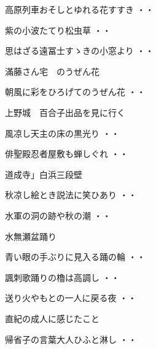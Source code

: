 \begin{shiika}高原列車おそしとゆれる花すすき
\hfill{・・}\end{shiika}
\begin{shiika}紫の小波たてり松虫草
\hfill{・・}\end{shiika}
\begin{shiika}思はざる遠冨士すゝきの小窓より
\hfill{・・}\end{shiika}
\vspace{0.6cm}
滿藤さん宅　のうぜん花
\begin{shiika}朝風に彩をひろげてのうぜん花
\hfill{・・}\end{shiika}
\vspace{0.6cm}
上野城　百合子出品を見に行く
\begin{shiika}風凉し天主の床の黒光り
\hfill{・・}\end{shiika}
\vspace{0.6cm}
\begin{shiika}俳聖殿忍者屋敷も蝉しぐれ
\hfill{・・}\end{shiika}
\vspace{0.6cm}
道成寺」白浜三段壁
\begin{shiika}秋凉し絵とき説法に笑ひあり
\hfill{・・}\end{shiika}
\begin{shiika}水軍の洞の跡や秋の潮
\hfill{・・}\end{shiika}
\vspace{0.6cm}
水無瀬盆踊り
\begin{shiika}青い眼の手ぶりに見入る踊の輪
\hfill{・・}\end{shiika}
\begin{shiika}諷刺歌踊りの櫓は高調し
\hfill{・・}\end{shiika}
\begin{shiika}送り火やもとの一人に戻る夜
\hfill{・・}\end{shiika}
\vspace{0.6cm}
直紀の成人に感じたこと
\begin{shiika}帰省子の言葉大人ひふと淋し
\hfill{・・}\end{shiika}
